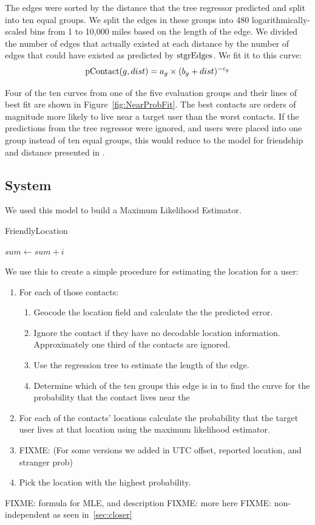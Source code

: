 The edges were sorted by the distance that the tree regressor predicted and
split into ten equal groups.
%
We split the edges in these groups into 480 logarithmically-scaled bins from 1
to 10,000 miles based on the length of the edge.
%
We divided the number of edges that actually existed at each distance by the
number of edges that could have existed as predicted by $\operatorname{stgrEdges}$.
%
We fit it to this curve:
%
\[
\operatorname{pContact}(g, dist) = a_{g} \times (b_{g}+dist)^{-c_{g}}
\]

Four of the ten curves from one of the five evaluation groups and their lines
of best fit are shown in Figure~\ref{fig:NearProbFit}.
%
The best contacts are orders of magnitude more
likely to live near a target user than the worst contacts.
%
If the predictions from the tree regressor were ignored, and users were placed
into one group instead of ten equal groups, this would reduce to the model
for friendship and distance presented in \cite{backstrom2010find}.


\subsection{System}
We used this model to build a Maximum Likelihood Estimator.


\begin{algorithm}
  \caption{FriendlyLocation \label{alg:friendloc}}
  \begin{algorithmic}[0]
   \State $sum\gets sum+i$
  \EndFor
  \end{algorithmic}
\end{algorithm}

We use this to create a simple procedure for estimating the location for a user:
\begin{enumerate}
\item For each of those contacts:
\begin{enumerate}
    \item Geocode the location field and calculate the the predicted error.
    \item Ignore the contact if they have no decodable location information.
    Approximately one third of the contacts are ignored.
    \item Use the regression tree to estimate the length of the edge.
    \item Determine which of the ten groups this edge is in to find the curve
        for the probability that the contact lives near the
\end{enumerate}
\item For each of the contacts' locations calculate the probability that the
target user lives at that location using the maximum likelihood estimator.
\item FIXME: (For some versions we added in UTC offset, reported location, and stranger prob)
\item Pick the location with the highest probability.
\end{enumerate}

FIXME: formula for MLE, and description
FIXME: more here
FIXME: non-independent as seen in~\ref{sec:closer}

